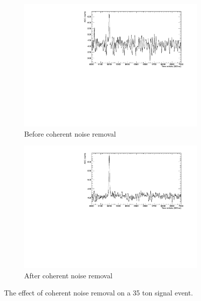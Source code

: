 \begin{figure}[h!]
  \centering
  \begin{subfigure}{0.45\textwidth}
    \centering
    \includegraphics[width=\textwidth]{BeforeCoherent}
    \caption{Before coherent noise removal}
  \end{subfigure}
  \hspace{0.08\textwidth}
  \begin{subfigure}{0.45\textwidth}
    \centering
    \includegraphics[width=\textwidth]{AfterCoherent}
    \caption{After coherent noise removal}
  \end{subfigure}
  \caption[Removing coherent noise in the 35 ton]{The effect of coherent noise removal on a 35 ton signal event.}
  \label{fig:CoherentNoise}
\end{figure}

